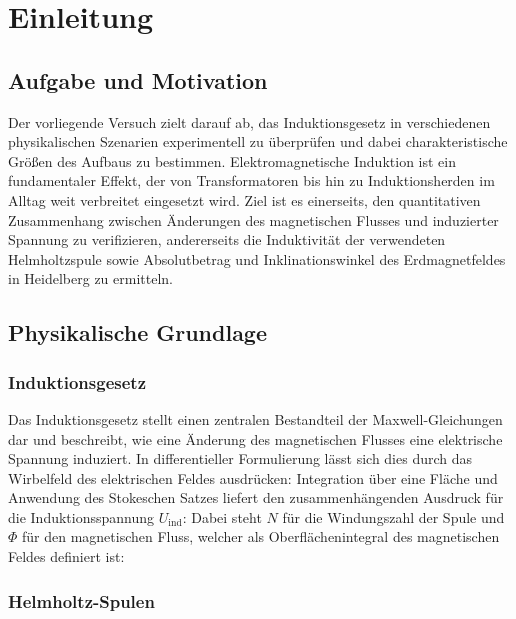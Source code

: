 \chapter{Einleitung} \label{ch:Einleitung}

\section{Aufgabe und Motivation}
\label{sec:AuM}

Der vorliegende Versuch zielt darauf ab, das Induktionsgesetz in verschiedenen physikalischen Szenarien experimentell zu überprüfen und dabei charakteristische Größen des Aufbaus zu bestimmen. Elektromagnetische Induktion ist ein fundamentaler Effekt, der von Transformatoren bis hin zu Induktionsherden im Alltag weit verbreitet eingesetzt wird.  Ziel ist es einerseits, den quantitativen Zusammenhang zwischen Änderungen des magnetischen Flusses und induzierter Spannung zu verifizieren, andererseits die Induktivität der verwendeten Helmholtzspule sowie Absolutbetrag und Inklinationswinkel des Erdmagnetfeldes in Heidelberg zu ermitteln.

\section{Physikalische Grundlage}
\label{sec:PhyBasics}

\subsection{Induktionsgesetz}

Das Induktionsgesetz stellt einen zentralen Bestandteil der Maxwell-Gleichungen dar und beschreibt, wie eine Änderung des magnetischen Flusses eine elektrische Spannung induziert. In differentieller Formulierung lässt sich dies durch das Wirbelfeld des elektrischen Feldes ausdrücken:
Integration über eine Fläche und Anwendung des Stokeschen Satzes liefert den zusammenhängenden Ausdruck für die Induktionsspannung \( U_{\text{ind}} \):
Dabei steht \( N \) für die Windungszahl der Spule und \( \Phi \) für den magnetischen Fluss, welcher als Oberflächenintegral des magnetischen Feldes definiert ist:

\subsection{Helmholtz-Spulen}


